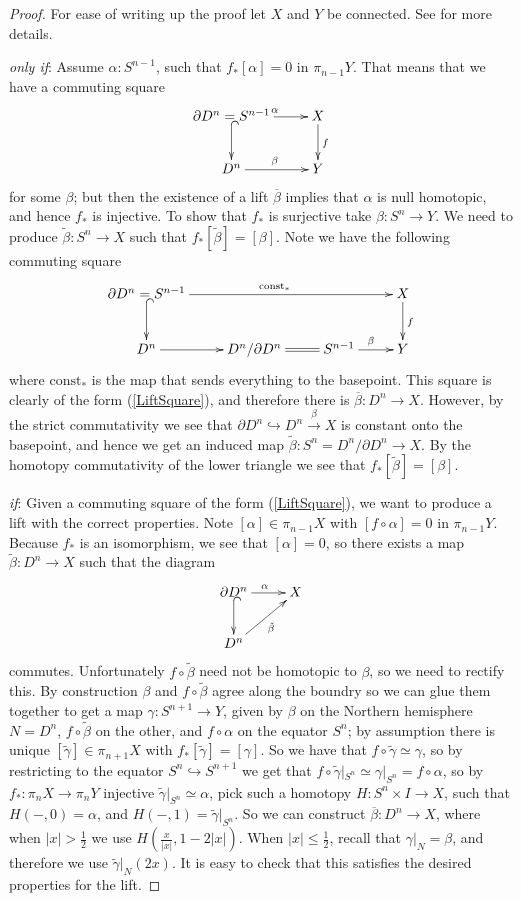 \documentclass{article}
\newtheorem{proposed work}[theorem]{Proposed Work}
\newcommand{\xymat}[1]{\begin{align*}\xymatrix{ #1}\end{align*}}
\begin{document}
\begin{proof}
For ease of writing up the proof let $X$ and $Y$ be connected. See \cite{may1999concise} for more details.

\emph{only if}: Assume $\alpha: S^{n-1}$, such that $f_*[\alpha]=0$ in $\pi_{n-1}Y$. That means that we have a commuting square 
\xymat{\partial D^n=S^{n-1} \ar[r]^\alpha \ar@{^{(}->}[d] & X \ar[d]^f \\ D^n \ar[r]^\beta & Y} for some $\beta$; but then the existence of a lift $\overline{\beta}$ implies that $\alpha$ is null homotopic, and hence $f_*$ is injective. To show that $f_*$ is surjective take $\beta: S^n\to Y$. We need to produce $\tilde{\beta}: S^n\to X$ such that $f_*[\tilde{\beta}]=[\beta]$. Note we have the following commuting square
\xymat{\partial D^n=S^{n-1} \ar[rrr]^{\text{const}_*} \ar@{^{(}->}[d]& & & X \ar[d]^f \\ D^n \ar[r] & D^n/\partial D^n \ar@{=}[r]&S^{n-1} \ar[r]^\beta & Y}
where $\text{const}_*$ is the map that sends everything to the basepoint. This square is clearly of the form (\ref{LiftSquare}), and therefore there is $\overline{\beta}: D^n \to X$. However, by the strict commutativity we see that $\partial D^n \hookrightarrow D^n \stackrel{\beta}{\to} X$ is constant onto the basepoint, and hence we get an induced map $\tilde{\beta}:S^n=D^n/\partial D^n \to X$. By the homotopy commutativity of the lower triangle we see that $f_*[\tilde{\beta}]=[\beta]$.

\emph{if}: Given a commuting square of the form (\ref{LiftSquare}), we want to produce a lift with the correct properties. Note $[\alpha]\in\pi_{n-1} X$ with $[f\circ \alpha]=0$ in $\pi_{n-1} Y$. Because $f_*$ is an isomorphism, we see that $[\alpha]=0$, so there exists a map $\tilde{\beta}:D^n\to X$ such that the diagram
\xymat{\partial D^n \ar@{^{(}->}[d] \ar[r]^\alpha & X \\ D^n\ar[ur]_{\tilde{\beta}}}
commutes. Unfortunately $f\circ \tilde{\beta}$ need not be homotopic to $\beta$, so we need to rectify this. By construction $\beta$ and $f\circ \tilde{\beta}$ agree along the boundry so we can glue them together to get a map $\gamma: S^{n+1}\to Y$, given by $\beta$ on the Northern hemisphere $N=D^n$, $f\circ \tilde{\beta}$ on the other, and $f\circ \alpha$ on the equator $S^n$; by assumption there is unique $[\tilde{\gamma}]\in \pi_{n+1}X$ with $f_*[\tilde{\gamma}]=[\gamma]$. So we have that $f\circ \tilde{\gamma}\simeq \gamma$, so by restricting to the equator $S^n\hookrightarrow S^{n+1}$ we get
that $f\circ \tilde{\gamma}|_{S^n}\simeq \gamma|_{S^n}= f\circ \alpha$, so by $f_*:\pi_nX \to \pi_nY$ injective $\tilde{\gamma}|_{S^n}\simeq \alpha$, pick such a homotopy $H:S^n\times I \to X$, such that $H(-,0)=\alpha$, and $H(-,1)=\tilde{\gamma}|_{S^n}$. 
So we can construct $\overline{\beta}: D^n\to X$, where when $|x|>\frac{1}{2}$ we use $H(\frac{x}{|x|}, 1-2|x|)$. When $|x| \leq \frac{1}{2}$, recall that $\gamma|_N=\beta$, and therefore we use $\tilde{\gamma}|_N(2x)$.
 It is easy to check that this satisfies the desired properties for the lift.
\end{proof}
\end{document}
